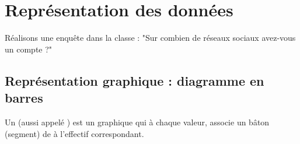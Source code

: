 \section{Représentation des données}
\setcounter{exemple}{0}

\begin{exemplebox}
    Réalisons une enquête dans la classe : "Sur combien de réseaux sociaux
    avez-vous un compte ?"
    \vspace{5cm}
\end{exemplebox}

\subsection{Représentation graphique : diagramme en barres}
\begin{definitionbox}
    Un  (aussi appelé ) est un
    graphique qui à chaque valeur, associe un bâton (segment) de
     à l'effectif correspondant.
\end{definitionbox}

\begin{center}
\end{center}


